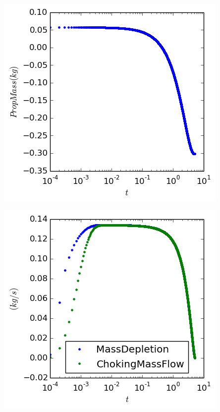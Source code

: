 \documentclass[cleanfoot,cleanhead,twocolumn,10pt,notitlepage]{asme2e}
\begin{document}
\includegraphics[width=\linewidth]{../python_stuff/Part2/PropMass.png}

\includegraphics[width=\linewidth]{../python_stuff/Part2/MassFlows.png}
\end{document}
